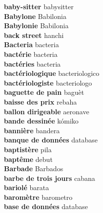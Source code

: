 \textbf{ baby-sitter  } babysitter \\
\textbf{ Babylone  } Babilonia \\
\textbf{ Babylonie  } Babilonia \\
\textbf{ back street  } hanchi \\
\textbf{ Bacteria  } bacteria \\
\textbf{ bactérie  } bacteria \\
\textbf{ bactéries  } bacteria \\
\textbf{ bactériologique  } bacteriologico \\
\textbf{ bactériologiste  } bacteriologo \\
\textbf{ baguette de pain  } baguèt \\
\textbf{ baisse des prix  } rebaha \\
\textbf{ ballon dirigeable  } aeronave \\
\textbf{ bande dessinée  } kómiko \\
\textbf{ bannière  } bandera \\
\textbf{ banque de données  } database \\
\textbf{ baptistère  } pila \\
\textbf{ baptême  } debut \\
\textbf{ Barbade  } Barbados \\
\textbf{ barbe de trois jours  } cabana \\
\textbf{ bariolé  } barata \\
\textbf{ baromètre  } barometro \\
\textbf{ base de données  } database \\
